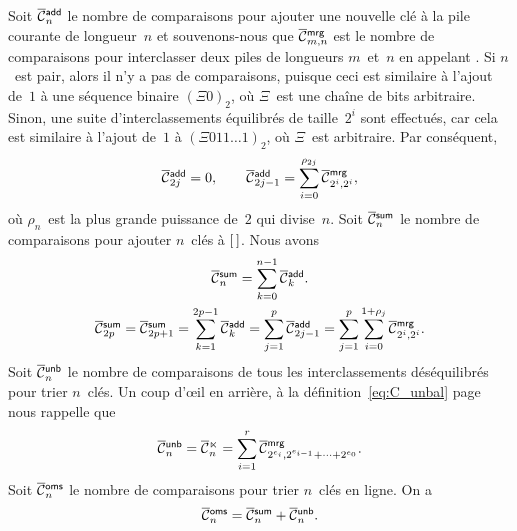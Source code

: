 Soit \(\OC{\fun{add}}{n}\) le nombre de
comparaisons pour ajouter une nouvelle clé à la pile courante de
longueur~\(n\) et souvenons-nous que
\(\OC{\fun{mrg}}{m,n}\) est le nombre
de comparaisons pour interclasser deux piles de longueurs
\(m\)~et~\(n\) en appelant . Si
\(n\)~est pair, alors il n'y a pas de comparaisons, puisque ceci est
similaire à l'ajout de~\(1\) à une séquence binaire \((\Xi{0})_2\), où
\(\Xi\)~est une chaîne de bits arbitraire. Sinon, une suite
d'interclassements équilibrés de taille~\(2^i\) sont effectués, car
cela est similaire à l'ajout de~\(1\) à \((\Xi{011}\ldots 1)_2\), où
\(\Xi\)~est arbitraire. Par conséquent,
\begin{equation*}
\abovedisplayskip=0pt
\belowdisplayskip=0pt
\OC{\fun{add}}{2j} = 0,\qquad
\OC{\fun{add}}{2j-1} = \sum_{i=0}^{\rho_{2j}}{\OC{\fun{mrg}}{2^i,2^i}},
\end{equation*}
où \(\rho_n\)~est la plus grande puissance de~\(2\) qui divise~\(n\).
Soit \(\OC{\fun{sum}}{n}\) le nombre de
comparaisons pour ajouter \(n\)~clés à \([\,]\). Nous avons
\begin{gather}
\abovedisplayskip=0pt
\belowdisplayskip=0pt
\OC{\fun{sum}}{n} = \sum_{k=0}^{n-1}{\OC{\fun{add}}{k}}.\notag\\
\OC{\fun{sum}}{2p} = \OC{\fun{sum}}{2p+1}
= \sum_{k=1}^{2p-1}{\OC{\fun{add}}{k}}
= \sum_{j=1}^{p}{\OC{\fun{add}}{2j-1}}
= \sum_{j=1}^{p}\sum_{i=0}^{1+\rho_{j}}{\OC{\fun{mrg}}{2^i,2^i}}.
\label{eq:sum_2p}
\end{gather}
Soit \(\OC{\fun{unb}}{n}\) le nombre de
comparaisons de tous les interclassements déséquilibrés pour trier
\(n\)~clés. Un coup d'œil en arrière, à la
définition~\eqref{eq:C_unbal} page~\pageref{eq:C_unbal} nous rappelle
que
\begin{equation}
\OC{\fun{unb}}{n}
= \OC{\ltimes}{n}
= \sum_{i=1}^{r}{\OC{\fun{mrg}}{2^{e_i},2^{e_{i-1}}+\dots+2^{e_0}}}.
\index{unb@$\OC{\fun{unb}}{n}$}
\label{eq:cost_unb}
\end{equation}
Soit \(\OC{\fun{oms}}{n}\) le nombre de
comparaisons pour trier \(n\)~clés en ligne. On a
\begin{equation}
\OC{\fun{oms}}{n} = \OC{\fun{sum}}{n} + \OC{\fun{unb}}{n}.
\index{sum@$\OC{\fun{sum}}{n}$}
\label{eq:ocost_online}
\end{equation}

